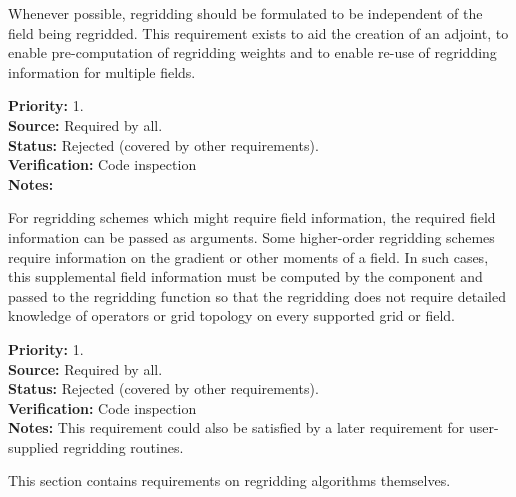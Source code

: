 
Whenever possible, regridding should be formulated to be
independent of the field being regridded.  This requirement exists to
aid the creation of an adjoint, to enable pre-computation of regridding
weights and to enable re-use of regridding information for multiple
fields.

\begin{reqlist}
{\bf Priority:} 1. \\
{\bf Source:} Required by all. \\
{\bf Status:} Rejected (covered by other requirements). \\
{\bf Verification:} Code inspection  \\
{\bf Notes:} 
\end{reqlist}


For regridding schemes which might require field information,
the required field information can be passed as arguments.
Some higher-order regridding schemes require information on the
gradient or other moments of a field.  In such cases, this 
supplemental field information must be computed by the component 
and passed to the regridding function so that the regridding does 
not require detailed knowledge of operators or grid topology on every
supported grid or field.

\begin{reqlist}
{\bf Priority:} 1. \\
{\bf Source:} Required by all. \\
{\bf Status:} Rejected (covered by other requirements). \\
{\bf Verification:} Code inspection  \\
{\bf Notes:} This requirement could also be satisfied by a later requirement
             for user-supplied regridding routines.
\end{reqlist}


This section contains requirements on regridding algorithms themselves.


